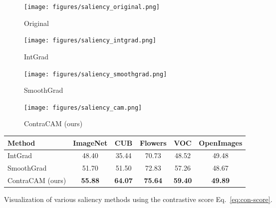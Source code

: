 \begin{figure}[h]
\centering\small

\begin{subfigure}{0.24\textwidth}
\texttt{[image: figures/saliency\_original.png]}
\caption{Original}
\end{subfigure}
\begin{subfigure}{0.24\textwidth}
\texttt{[image: figures/saliency\_intgrad.png]}
\caption{IntGrad \citep{sundararajan2017axiomatic}}
\end{subfigure}
\begin{subfigure}{0.24\textwidth}
\texttt{[image: figures/saliency\_smoothgrad.png]}
\caption{SmoothGrad \citep{smilkov2017smoothgrad}}
\end{subfigure}
\begin{subfigure}{0.24\textwidth}
\texttt{[image: figures/saliency\_cam.png]}
\caption{ContraCAM (ours)}
\end{subfigure}
\caption{
Visualization of various saliency methods using the contrastive score Eq.~\eqref{eq:con-score}.
}\label{fig:loc-saliency}

\label{tab:loc-saliency}
\begin{tabular}{lccccc}
\toprule
Method & ImageNet & CUB & Flowers & VOC & OpenImages \\
\midrule
IntGrad \citep{sundararajan2017axiomatic} & 48.40 & 35.44 & 70.73 & 48.52 & 49.48 \\
SmoothGrad \citep{smilkov2017smoothgrad}  & 51.70 & 51.50 & 72.83 & 57.26 & 48.67 \\
ContraCAM (ours) & \textbf{55.88} & \textbf{64.07} & \textbf{75.64} & \textbf{59.40} & \textbf{49.89} \\
\bottomrule
\end{tabular}
\end{figure}